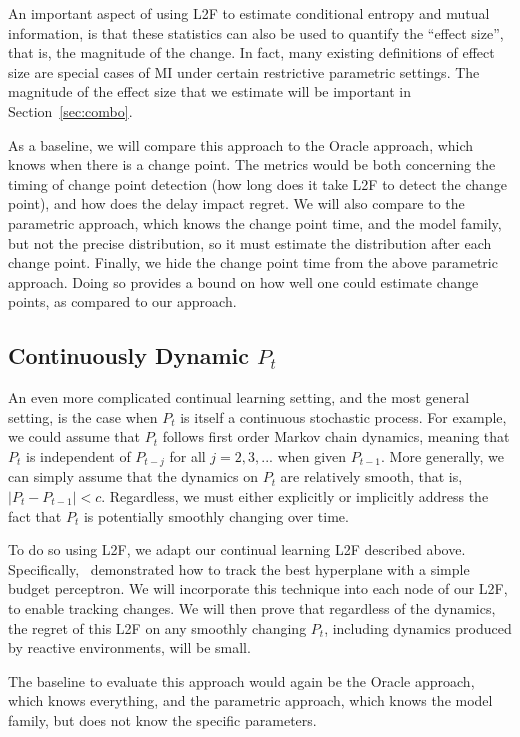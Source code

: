 \documentclass{article}
\begin{document}
An important aspect of using L2F to estimate conditional entropy and mutual information, is that these statistics can also be used to quantify the ``effect size'', that is, the magnitude of the change.  In fact, many existing definitions of effect size are special cases of MI under certain restrictive parametric settings.  The magnitude of the effect size that we estimate will be important in Section~\ref{sec:combo}.


As a baseline, we will compare this approach to the Oracle approach, which knows when there is a change point.  The metrics would be both concerning the timing of change point detection (how long does it take L2F to detect the change point), and how does the delay impact regret. We will also compare to the parametric approach, which knows the change point time, and the model family, but not the precise distribution, so it must estimate the distribution after each change point. Finally, we hide the change point time from the above parametric approach. Doing so provides a bound on how well one could estimate change points, as compared to our approach. 




\subsection{Continuously Dynamic $P_t$}
\label{sec:smooth}

An even more complicated continual learning setting, and the most general setting, is the case when $P_t$ is itself a continuous stochastic process.  For example, we could assume that $P_t$ follows  first order Markov chain dynamics, meaning that $P_t$ is independent of $P_{t-j}$  for all $j=2,3,...$ when given $P_{t-1}$.  More generally, we can simply assume that the dynamics on $P_t$ are relatively smooth, that is, $|P_t - P_{t-1}| < c$.  Regardless, we must either explicitly or implicitly address the fact that $P_t$ is potentially smoothly changing over time.  

To do so using L2F, we adapt our continual learning L2F described above.  Specifically,~\citet{Cavallanti2007} demonstrated how to track the best hyperplane with a simple budget perceptron.  We will incorporate this technique into each node of our L2F, to enable tracking changes. We will then prove that regardless of the dynamics, the regret of this L2F on any smoothly changing $P_t$, including dynamics produced by reactive environments, will be small.  

The baseline to evaluate this approach would again be the Oracle approach, which knows everything, and the parametric approach, which knows the model family, but does not know the specific parameters. 
\end{document}
